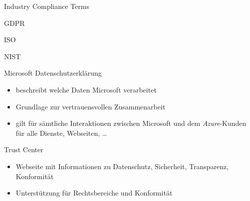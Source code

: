 
\begin{flashcard}[Understand]{Industry Compliance Terms}

\end{flashcard}

\begin{flashcard}[Understand]{GDPR}

\end{flashcard}

\begin{flashcard}[Describe]{ISO}

\end{flashcard}

\begin{flashcard}[Describe]{NIST}

\end{flashcard}

\begin{flashcard}[\ ]{Microsoft Datenschutzerklärung}
    \begin{itemize}
        \item beschreibt welche Daten Microsoft verarbeitet
        \item Grundlage zur vertrauensvollen Zusammenarbeit
        \item gilt für sämtliche Interaktionen zwischen Microsoft und dem \emph{Azure}-Kunden für alle Dienste, Webseiten, \ldots
    \end{itemize}
\end{flashcard}

\begin{flashcard}[Definition]{Trust Center}
    \begin{itemize}
        \item Webseite mit Informationen zu Datenschutz, Sicherheit, Transparenz, Konformität
        \item Unterstützung für Rechtsbereiche und Konformität
    \end{itemize}
\end{flashcard}

